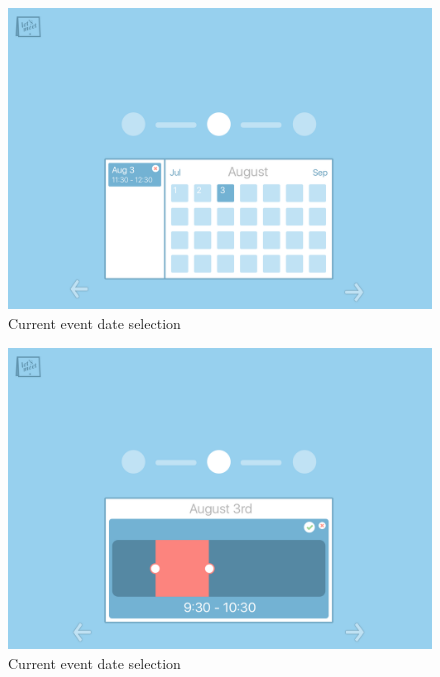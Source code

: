 \documentclass{sigchi}
\begin{document}
\begin{figure}
  \centering
  \includegraphics[width=1.75\columnwidth]{Mockup/DateSelection}
  \caption{Current event date selection}
\end{figure}

\begin{figure}
  \centering
  \includegraphics[width=1.75\columnwidth]{Mockup/TimeSelection}
  \caption{Current event date selection}
\end{figure}
\end{document}
